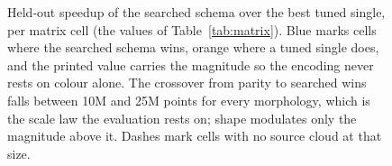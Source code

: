 \begin{figure}[t]
  \caption{Held-out speedup of the searched schema over the best tuned single, per
  matrix cell (the values of Table~\ref{tab:matrix}). Blue marks cells where the
  searched schema wins, orange where a tuned single does, and the printed value
  carries the magnitude so the encoding never rests on colour alone. The crossover
  from parity to searched wins falls between 10M and 25M points for every
  morphology, which is the scale law the evaluation rests on; shape modulates only
  the magnitude above it. Dashes mark cells with no source cloud at that size.}
  \label{fig:matrix-heatmap}
\end{figure}
